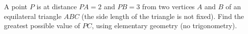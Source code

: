 A point $P$ is at distance $PA=2$ and $PB=3$ from two vertices $A$ and $B$ of an equilateral triangle $ABC$ (the side length of the triangle is not fixed). Find the greatest possible value of $PC$, using elementary geometry (no trigonometry).
